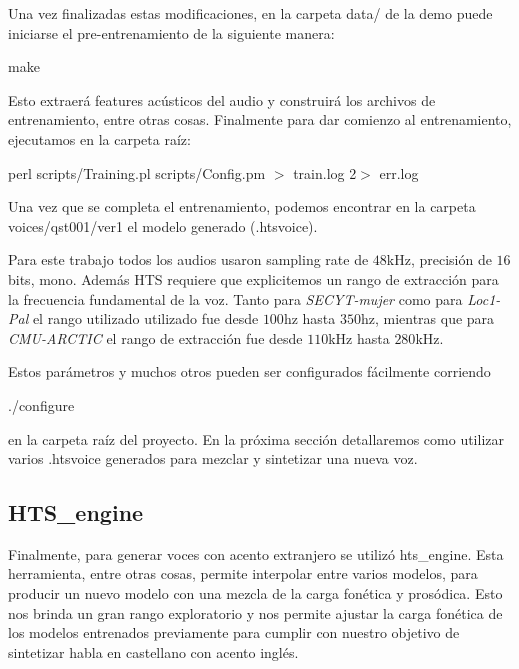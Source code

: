 Una vez finalizadas estas modificaciones, en la carpeta data/ de la demo puede iniciarse el pre-entrenamiento de la siguiente manera:

\begin{tcolorbox}
make
\end{tcolorbox}

\noindent Esto extraerá features acústicos del audio y construirá los archivos de entrenamiento, entre otras cosas. Finalmente para dar comienzo al entrenamiento, ejecutamos en la carpeta raíz:

\begin{tcolorbox}
perl scripts/Training.pl scripts/Config.pm $>$ train.log 2$>$ err.log
\end{tcolorbox}

Una vez que se completa el entrenamiento, podemos encontrar en la carpeta voices/qst001/ver1 el modelo generado (.htsvoice).

Para este trabajo todos los audios usaron sampling rate de $48$kHz, precisión de $16$bits, mono. Además HTS requiere que explicitemos un rango de extracción para la frecuencia fundamental de la voz. Tanto para \textit{SECYT-mujer} como para \textit{Loc1-Pal} el rango utilizado utilizado fue desde $100$hz hasta $350$hz, mientras que para \textit{CMU-ARCTIC} el rango de extracción fue desde $110$kHz hasta $280$kHz.

Estos parámetros y muchos otros pueden ser configurados fácilmente corriendo

\begin{tcolorbox}
./configure
\end{tcolorbox}

\noindent en la carpeta raíz del proyecto. En la próxima sección detallaremos como utilizar varios .htsvoice generados para mezclar y sintetizar una nueva voz.

\subsection{HTS\_engine} \label{interpolationTeory}

Finalmente, para generar voces con acento extranjero se utilizó hts\_engine. Esta herramienta, entre otras cosas, permite interpolar entre varios modelos, para producir un nuevo modelo con una mezcla de la carga fonética y prosódica. Esto nos brinda un gran rango exploratorio y nos permite ajustar la carga fonética de los modelos entrenados previamente para cumplir con nuestro objetivo de sintetizar habla en castellano con acento inglés.

